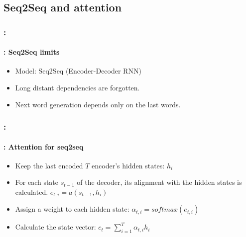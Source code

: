 \documentclass[xcolor=table]{beamer}
\begin{document}
\begin{frame}
	\frametitle{\insertshortsubtitle}
	\framesubtitle{\insertsection}
	
	
	
\end{frame}

\subsection{Seq2Seq and attention}

\begin{frame}
	\frametitle{\insertshortsubtitle: \insertsection}
	\framesubtitle{\insertsubsection: Seq2Seq limits}
	
	\begin{center}
	\end{center}
	
	\begin{itemize}
		\item Model: Seq2Seq (Encoder-Decoder RNN)
		\item Long distant dependencies are forgotten.
		\item Next word generation depends only on the last words.
	\end{itemize}
	
\end{frame}

\begin{frame}
	\frametitle{\insertshortsubtitle: \insertsection}
	\framesubtitle{\insertsubsection: Attention for seq2seq}
	
	\begin{center}
	\end{center}
	
	\vskip-6pt
	\begin{itemize}
		\item Keep the last encoded $T$ encoder's hidden states: $h_i$
		\item For each state $s_{t-1}$ of the decoder, its alignment with the hidden states is calculated.
		$ e_{t, i} = a(s_{t-1}, h_i) $
		\item Assign a weight to each hidden state: $\alpha_{t, i} = softmax(e_{t, i})$
		\item Calculate the state vector: $c_t = \sum_{i=1}^{T} \alpha_{t, i} h_i$
	\end{itemize}
	
\end{frame}
\end{document}
